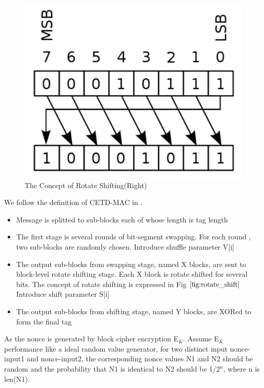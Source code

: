 \documentclass{article}
\begin{document}
\begin{figure}[htbp]
 \centering
 \includegraphics[scale=0.4]{./diagrams/rotate_right.pdf}
 \caption{The Concept of Rotate Shifting(Right)}
 \label{fig:rotate_shift}
\end{figure}
We follow the definition of CETD-MAC in \cite{keylist}. 
\begin{itemize}
	\item Message is splitted to sub-blocks each of whose length is tag length
	\item The first stage is several rounds of bit-segment swapping. For each round , two sub-blocks are randomly chosen. Introduce shuffle parameter V[i]
	\item The output sub-blocks from swapping stage, named X blocks, are sent to block-level rotate shifting stage. Each X block is rotate shifted for several bits. The concept of rotate shifting is expressed in Fig $\ref{fig:rotate_shift}$ Introduce shift parameter S[i]
	\item The output sub-blocks from shifting stage, named Y blocks, are XORed to form the final tag
\end{itemize}
As the nonce is generated by block cipher encryption E$_K$. Assume E$_K$ performance like a ideal random value generator, for two distinct input nonce-input1 and nonce-input2, the corresponding nonce values N1 and N2 should be random and the probability that N1 is identical to N2 should be 1/2$^n$, where n is len(N1). 
\end{document}
